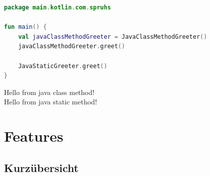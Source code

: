 \documentclass[11pt]{article}
\begin{document}
    \begin{lstlisting}[language=Kotlin, caption={Main.kt}]
package main.kotlin.com.spruhs

fun main() {
    val javaClassMethodGreeter = JavaClassMethodGreeter()
    javaClassMethodGreeter.greet()

    JavaStaticGreeter.greet()
}
    \end{lstlisting}

    \begin{tcolorbox}[colback=black!5!white, colframe=black, title=Ausgabe]
        Hello from java class method!\\
        Hello from java static method!\\
    \end{tcolorbox}

    \section{Features}

    \subsection{Kurzübersicht}
\end{document}
